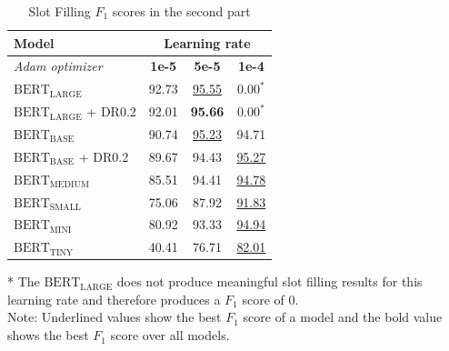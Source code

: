 \documentclass[a4paper]{article}
\begin{document}
\begin{table}[ht!]
  \caption{Slot Filling $F_1$ scores in the second part}
  \label{tab:slot_filling_part2}
  \centering
  \begin{tabular}{l|c c c}
    \toprule
    \textbf{Model} & \multicolumn{3}{c}{\textbf{Learning rate} } \\
    \midrule
    \textit{Adam optimizer} & \textbf{1e-5} & \textbf{5e-5} & \textbf{1e-4} \\
    \midrule
    $\text{BERT}_{\text{LARGE}}$ & 92.73 & \underline{95.55} & $0.00^*$ \\
    $\text{BERT}_{\text{LARGE}}$ + DR0.2 & 92.01 & \textbf{95.66} & $0.00^*$ \\
    $\text{BERT}_{\text{BASE}}$ & 90.74 & \underline{95.23} & 94.71 \\
    $\text{BERT}_{\text{BASE}}$ + DR0.2 & 89.67 & 94.43 & \underline{95.27} \\
    $\text{BERT}_{\text{MEDIUM}}$ & 85.51 & 94.41 & \underline{94.78} \\
    $\text{BERT}_{\text{SMALL}}$ & 75.06 & 87.92 & \underline{91.83} \\
    $\text{BERT}_{\text{MINI}}$ & 80.92 & 93.33 & \underline{94.94} \\
    $\text{BERT}_{\text{TINY}}$ & 40.41 & 76.71 & \underline{82.01} \\
    \bottomrule
  \end{tabular}
  \begin{minipage}{7.5cm}
    \vspace{0.1cm}
    * The $\text{BERT}_{\text{LARGE}}$ does not produce meaningful slot filling results for this learning rate and therefore produces a $F_1$ score of 0.\\
    Note: Underlined values show the best $F_1$ score of a model and the bold value shows the best $F_1$ score over all models.
  \end{minipage}
\end{table}
\end{document}
